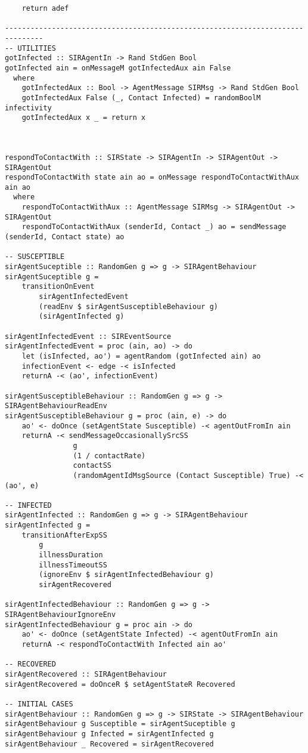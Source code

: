 \begin{verbatim}
    return adef
   
-------------------------------------------------------------------------------
-- UTILITIES
gotInfected :: SIRAgentIn -> Rand StdGen Bool
gotInfected ain = onMessageM gotInfectedAux ain False
  where
    gotInfectedAux :: Bool -> AgentMessage SIRMsg -> Rand StdGen Bool
    gotInfectedAux False (_, Contact Infected) = randomBoolM infectivity
    gotInfectedAux x _ = return x



respondToContactWith :: SIRState -> SIRAgentIn -> SIRAgentOut -> SIRAgentOut
respondToContactWith state ain ao = onMessage respondToContactWithAux ain ao
  where
    respondToContactWithAux :: AgentMessage SIRMsg -> SIRAgentOut -> SIRAgentOut
    respondToContactWithAux (senderId, Contact _) ao = sendMessage (senderId, Contact state) ao

-- SUSCEPTIBLE
sirAgentSuceptible :: RandomGen g => g -> SIRAgentBehaviour
sirAgentSuceptible g = 
	transitionOnEvent 
		sirAgentInfectedEvent 
		(readEnv $ sirAgentSusceptibleBehaviour g) 
		(sirAgentInfected g)

sirAgentInfectedEvent :: SIREventSource
sirAgentInfectedEvent = proc (ain, ao) -> do
    let (isInfected, ao') = agentRandom (gotInfected ain) ao 
    infectionEvent <- edge -< isInfected
    returnA -< (ao', infectionEvent)

sirAgentSusceptibleBehaviour :: RandomGen g => g -> SIRAgentBehaviourReadEnv
sirAgentSusceptibleBehaviour g = proc (ain, e) -> do
    ao' <- doOnce (setAgentState Susceptible) -< agentOutFromIn ain
    returnA -< sendMessageOccasionallySrcSS 
    			g
    			(1 / contactRate)
    			contactSS
    			(randomAgentIdMsgSource (Contact Susceptible) True) -< (ao', e)

-- INFECTED
sirAgentInfected :: RandomGen g => g -> SIRAgentBehaviour
sirAgentInfected g = 
	transitionAfterExpSS 
		g 
		illnessDuration 
		illnessTimeoutSS 
		(ignoreEnv $ sirAgentInfectedBehaviour g) 
		sirAgentRecovered

sirAgentInfectedBehaviour :: RandomGen g => g -> SIRAgentBehaviourIgnoreEnv
sirAgentInfectedBehaviour g = proc ain -> do
    ao' <- doOnce (setAgentState Infected) -< agentOutFromIn ain
    returnA -< respondToContactWith Infected ain ao'

-- RECOVERED
sirAgentRecovered :: SIRAgentBehaviour
sirAgentRecovered = doOnceR $ setAgentStateR Recovered

-- INITIAL CASES
sirAgentBehaviour :: RandomGen g => g -> SIRState -> SIRAgentBehaviour
sirAgentBehaviour g Susceptible = sirAgentSuceptible g
sirAgentBehaviour g Infected = sirAgentInfected g
sirAgentBehaviour _ Recovered = sirAgentRecovered


\end{verbatim}
